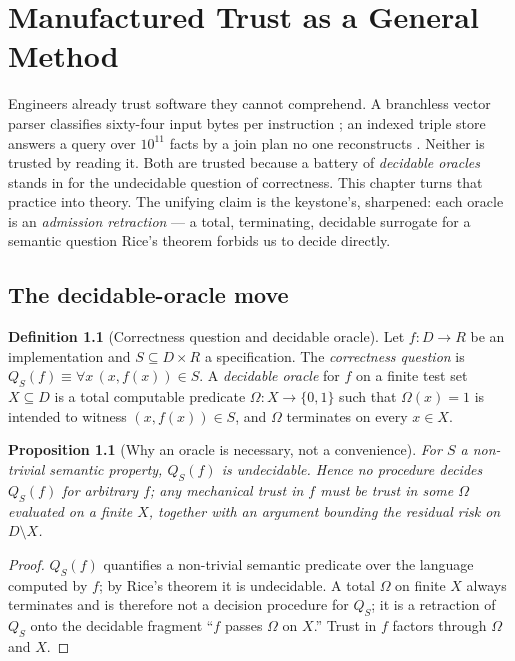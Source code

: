 \documentclass[11pt,oneside]{book}
\theoremstyle{definition}
\newtheorem{definition}{Definition}[chapter]
\theoremstyle{plain}
\newtheorem{proposition}[theorem]{Proposition}
\theoremstyle{remark}
\begin{document}
\chapter{Manufactured Trust as a General Method}
\label{ch:mt}

Engineers already trust software they cannot comprehend. %
A branchless vector parser classifies sixty-four input bytes per instruction \cite{simdjson}; an indexed triple store answers a query over $10^{11}$ facts by a join plan no one reconstructs \cite{qlever}. %
Neither is trusted by reading it. %
Both are trusted because a battery of \emph{decidable oracles} stands in for the undecidable question of correctness. %
This chapter turns that practice into theory. %
The unifying claim is the keystone's, sharpened: each oracle is an \emph{admission retraction} --- a total, terminating, decidable surrogate for a semantic question Rice's theorem forbids us to decide directly. %

\section{The decidable-oracle move}

\begin{definition}[Correctness question and decidable oracle]\label{def:oracle}
Let $f:D\to R$ be an implementation and $S\subseteq D\times R$ a specification. %
The \emph{correctness question} is $Q_S(f)\equiv\forall x\,(x,f(x))\in S$. %
A \emph{decidable oracle} for $f$ on a finite test set $X\subseteq D$ is a total computable predicate $\Omega:X\to\{0,1\}$ such that $\Omega(x)=1$ is intended to witness $(x,f(x))\in S$, and $\Omega$ terminates on every $x\in X$. %
\end{definition}

\begin{proposition}[Why an oracle is necessary, not a convenience]\label{prop:necessity}
For $S$ a non-trivial semantic property, $Q_S(f)$ is undecidable. %
Hence no procedure decides $Q_S(f)$ for arbitrary $f$; any mechanical trust in $f$ must be trust in some $\Omega$ evaluated on a finite $X$, together with an argument bounding the residual risk on $D\setminus X$. %
\end{proposition}

\begin{proof}
$Q_S(f)$ quantifies a non-trivial semantic predicate over the language computed by $f$; by Rice's theorem \cite{rice1953} it is undecidable. %
A total $\Omega$ on finite $X$ always terminates and is therefore not a decision procedure for $Q_S$; it is a retraction of $Q_S$ onto the decidable fragment ``$f$ passes $\Omega$ on $X$.'' %
Trust in $f$ factors through $\Omega$ and $X$. %
\end{proof}
\end{document}
